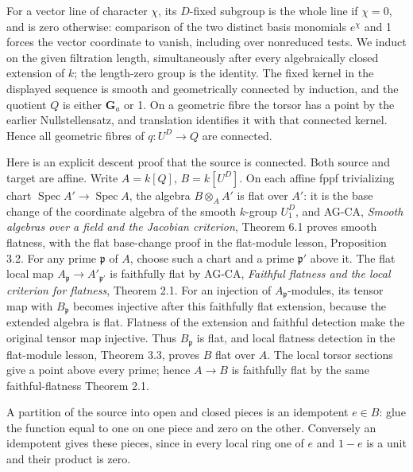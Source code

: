 \documentclass[11pt,a4paper,openany]{report}
\begin{document}
For a vector line of character \(\chi\), its \(D\)-fixed subgroup is the whole line if \(\chi=0\), and is zero otherwise: comparison of the two distinct basis monomials \(e^\chi\) and 1 forces the vector coordinate to vanish, including over nonreduced tests. We induct on the given filtration length, simultaneously after every algebraically closed extension of \(k\); the length-zero group is the identity. The fixed kernel in the displayed sequence is smooth and geometrically connected by induction, and the quotient \(Q\) is either \(\mathbf G_a\) or 1. On a geometric fibre the torsor has a point by the earlier Nullstellensatz, and translation identifies it with that connected kernel. Hence all geometric fibres of \(q:U^D\to Q\) are connected.

Here is an explicit descent proof that the source is connected. Both source and target are affine. Write \(A=k[Q]\), \(B=k[U^D]\). On each affine fppf trivializing chart \(\operatorname{Spec}A'\to\operatorname{Spec}A\), the algebra \(B\otimes_A A'\) is flat over \(A'\): it is the base change of the coordinate algebra of the smooth \(k\)-group \(U_1^D\), and AG-CA, \emph{Smooth algebras over a field and the Jacobian criterion}, Theorem 6.1 proves smooth flatness, with the flat base-change proof in the flat-module lesson, Proposition 3.2. For any prime \(\mathfrak p\) of \(A\), choose such a chart and a prime \(\mathfrak p'\) above it. The flat local map \(A_{\mathfrak p}\to A'_{\mathfrak p'}\) is faithfully flat by AG-CA, \emph{Faithful flatness and the local criterion for flatness}, Theorem 2.1. For an injection of \(A_{\mathfrak p}\)-modules, its tensor map with \(B_{\mathfrak p}\) becomes injective after this faithfully flat extension, because the extended algebra is flat. Flatness of the extension and faithful detection make the original tensor map injective. Thus \(B_{\mathfrak p}\) is flat, and local flatness detection in the flat-module lesson, Theorem 3.3, proves \(B\) flat over \(A\). The local torsor sections give a point above every prime; hence \(A\to B\) is faithfully flat by the same faithful-flatness Theorem 2.1.

A partition of the source into open and closed pieces is an idempotent \(e\in B\): glue the function equal to one on one piece and zero on the other. Conversely an idempotent gives these pieces, since in every local ring one of \(e\) and \(1-e\) is a unit and their product is zero.
\end{document}
